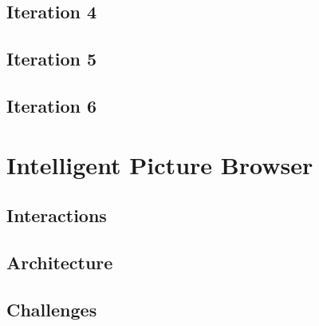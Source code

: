 \documentclass[11pt,a4paper]{article}
\begin{document}

\subsection{Iteration 4}


\subsection{Iteration 5}


\subsection{Iteration 6}




\section{Intelligent Picture Browser}




\subsection{Interactions}


\subsection{Architecture}




\subsection{Challenges}
\end{document}
